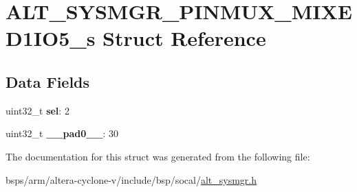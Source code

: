 \hypertarget{structALT__SYSMGR__PINMUX__MIXED1IO5__s}{}\section{A\+L\+T\+\_\+\+S\+Y\+S\+M\+G\+R\+\_\+\+P\+I\+N\+M\+U\+X\+\_\+\+M\+I\+X\+E\+D1\+I\+O5\+\_\+s Struct Reference}
\label{structALT__SYSMGR__PINMUX__MIXED1IO5__s}
\subsection*{Data Fields}
\begin{DoxyCompactItemize}
\item 
\mbox{\label{structALT__SYSMGR__PINMUX__MIXED1IO5__s_a56e991a8a5f4c7b56dc4b2f19c297414}} 
uint32\+\_\+t {\bfseries sel}\+: 2
\item 
\mbox{\label{structALT__SYSMGR__PINMUX__MIXED1IO5__s_a8ed113caba86cd4f2866c747f7a02664}} 
uint32\+\_\+t {\bfseries \+\_\+\+\_\+pad0\+\_\+\+\_\+}\+: 30
\end{DoxyCompactItemize}


The documentation for this struct was generated from the following file\+:\begin{DoxyCompactItemize}
\item 
bsps/arm/altera-\/cyclone-\/v/include/bsp/socal/\mbox{\hyperlink{alt__sysmgr_8h}{alt\+\_\+sysmgr.\+h}}\end{DoxyCompactItemize}
